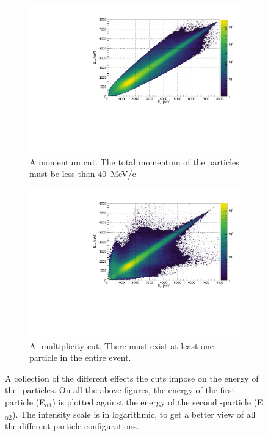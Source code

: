 \begin{figure}[H]
\begin{subfigure}[t]{0.5\linewidth}
		\includegraphics[width=\linewidth]{../figures/EEMomentumCut.pdf}
		\caption{A momentum cut. The total momentum of the particles must be less than \SI{40}{MeV/c}}
		\label{fig:EEMomentumCut}
	\end{subfigure}
	\begin{subfigure}[t]{0.5\linewidth}
		\includegraphics[width=\linewidth]{../figures/EEBetaMulCut.pdf}
		\caption{A \be-multiplicity cut. There must exist at least one \be-particle in the entire event. }
		\label{fig:EEBetaMulCut}
	\end{subfigure}
	\caption{A collection of the different effects the cuts impose on the energy of the \al-particles. On all the above figures, the energy of the first \al-particle (E$_{\alpha1}$) is plotted against the energy of the second \al-particle (E$_{\alpha2}$). The intensity scale is in logarithmic, to get a better view of all the different particle configurations.}
\end{figure}

